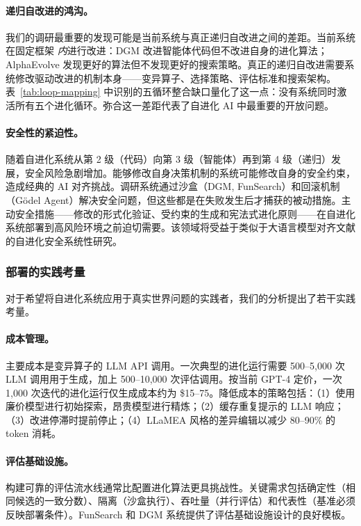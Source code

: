 \paragraph{递归自改进的鸿沟。}
我们的调研最重要的发现可能是当前系统与真正递归自改进之间的差距。当前系统在固定框架 \emph{内}进行改进：DGM 改进智能体代码但不改进自身的进化算法；AlphaEvolve 发现更好的算法但不发现更好的搜索策略。真正的递归自改进需要系统修改驱动改进的机制本身——变异算子、选择策略、评估标准和搜索架构。表~\ref{tab:loop-mapping} 中识别的五循环整合缺口量化了这一点：没有系统同时激活所有五个进化循环。弥合这一差距代表了自进化 AI 中最重要的开放问题。

\paragraph{安全性的紧迫性。}
随着自进化系统从第 2 级（代码）向第 3 级（智能体）再到第 4 级（递归）发展，安全风险急剧增加。能够修改自身决策机制的系统可能修改自身的安全约束，造成经典的 AI 对齐挑战。调研系统通过沙盒（DGM, FunSearch）和回滚机制（G\"{o}del Agent）解决安全问题，但这些都是在失败发生后才捕获的被动措施。主动安全措施——修改的形式化验证、受约束的生成和宪法式进化原则——在自进化系统部署到高风险环境之前迫切需要。该领域将受益于类似于大语言模型对齐文献的自进化安全系统性研究。


\subsubsection{部署的实践考量}

对于希望将自进化系统应用于真实世界问题的实践者，我们的分析提出了若干实践考量。

\paragraph{成本管理。}
主要成本是变异算子的 LLM API 调用。一次典型的进化运行需要 500--5,000 次 LLM 调用用于生成，加上 500--10,000 次评估调用。按当前 GPT-4 定价，一次 1,000 次迭代的进化运行仅生成成本约为 \$15--75。降低成本的策略包括：（1）使用廉价模型进行初始探索，昂贵模型进行精炼；（2）缓存重复提示的 LLM 响应；（3）改进停滞时提前停止；（4）LLaMEA 风格的差异编辑以减少 80--90\% 的 token 消耗。

\paragraph{评估基础设施。}
构建可靠的评估流水线通常比配置进化算法更具挑战性。关键需求包括确定性（相同候选的一致分数）、隔离（沙盒执行）、吞吐量（并行评估）和代表性（基准必须反映部署条件）。FunSearch 和 DGM 系统提供了评估基础设施设计的良好模板。

